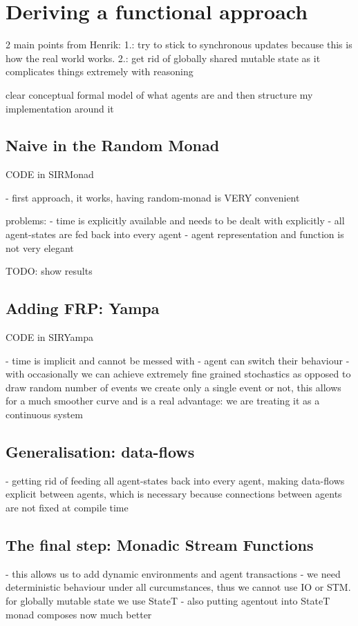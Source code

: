 \section{Deriving a functional approach}
2 main points from Henrik: 1.: try to stick to synchronous updates because this is how the real world works. 2.: get rid of globally shared mutable state as it complicates things extremely with reasoning

clear conceptual formal model of what agents are and then structure my implementation around it

\subsection{Naive in the Random Monad}
CODE in SIRMonad 

- first approach, it works, having random-monad is VERY convenient

problems:
- time is explicitly available and needs to be dealt with explicitly
- all agent-states are fed back into every agent
- agent representation and function is not very elegant 


TODO: show results

\subsection{Adding FRP: Yampa}
CODE in SIRYampa

- time is implicit and cannot be messed with
- agent can switch their behaviour
- with occasionally we can achieve extremely fine grained stochastics as opposed to draw random number of events we create only a single event or not, this allows for a much smoother curve and is a real advantage: we are treating it as a continuous system

\subsection{Generalisation: data-flows}
- getting rid of feeding all agent-states back into every agent, making data-flows explicit between agents, which is necessary because connections between agents are not fixed at compile time

\subsection{The final step: Monadic Stream Functions}
- this allows us to add dynamic environments and agent transactions
- we need deterministic behaviour under all curcumstances, thus we cannot use IO or STM. for globally mutable state we use StateT
- also putting agentout into StateT monad composes now much better
